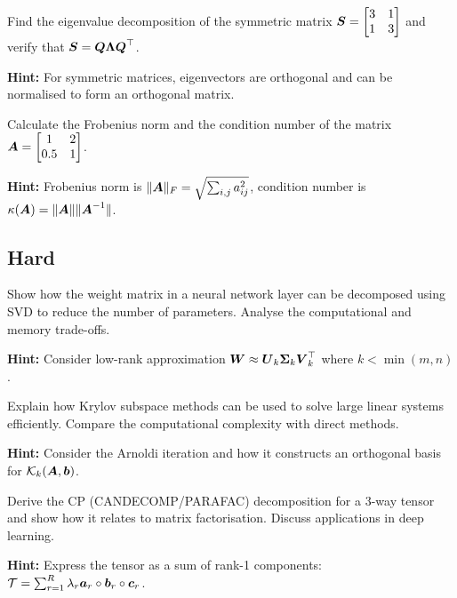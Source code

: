 \begin{problem}
Find the eigenvalue decomposition of the symmetric matrix $\boldsymbol{S} = \begin{bmatrix} 3 & 1 \\ 1 & 3 \end{bmatrix}$ and verify that $\boldsymbol{S} = \boldsymbol{Q}\boldsymbol{\Lambda}\boldsymbol{Q}^\top$.

\textbf{Hint:} For symmetric matrices, eigenvectors are orthogonal and can be normalised to form an orthogonal matrix.
\end{problem}

\begin{problem}
Calculate the Frobenius norm and the condition number of the matrix $\boldsymbol{A} = \begin{bmatrix} 1 & 2 \\ 0.5 & 1 \end{bmatrix}$.

\textbf{Hint:} Frobenius norm is $\|\boldsymbol{A}\|_F = \sqrt{\sum_{i,j} a_{ij}^2}$, condition number is $\kappa(\boldsymbol{A}) = \|\boldsymbol{A}\|\|\boldsymbol{A}^{-1}\|$.
\end{problem}

\subsection*{Hard}

\begin{problem}
Show how the weight matrix in a neural network layer can be decomposed using SVD to reduce the number of parameters. Analyse the computational and memory trade-offs.

\textbf{Hint:} Consider low-rank approximation $\boldsymbol{W} \approx \boldsymbol{U}_k \boldsymbol{\Sigma}_k \boldsymbol{V}_k^\top$ where $k < \min(m,n)$.
\end{problem}

\begin{problem}
Explain how Krylov subspace methods can be used to solve large linear systems efficiently. Compare the computational complexity with direct methods.

\textbf{Hint:} Consider the Arnoldi iteration and how it constructs an orthogonal basis for $\mathcal{K}_k(\boldsymbol{A}, \boldsymbol{b})$.
\end{problem}

\begin{problem}
Derive the CP (CANDECOMP/PARAFAC) decomposition for a 3-way tensor and show how it relates to matrix factorisation. Discuss applications in deep learning.

\textbf{Hint:} Express the tensor as a sum of rank-1 components: $\mathcal{T} = \sum_{r=1}^R \lambda_r \boldsymbol{a}_r \circ \boldsymbol{b}_r \circ \boldsymbol{c}_r$.
\end{problem}

